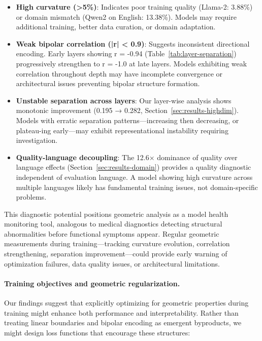 \documentclass[11pt]{article}
\begin{document}
\begin{itemize}
\item \textbf{High curvature (>5\%)}: Indicates poor training quality (Llama-2: 3.88\%) or domain mismatch (Qwen2 on English: 13.38\%). Models may require additional training, better data curation, or domain adaptation.

\item \textbf{Weak bipolar correlation (|r| < 0.9)}: Suggests inconsistent directional encoding. Early layers showing r = -0.94 (Table~\ref{tab:layer-separation}) progressively strengthen to r = -1.0 at late layers. Models exhibiting weak correlation throughout depth may have incomplete convergence or architectural issues preventing bipolar structure formation.

\item \textbf{Unstable separation across layers}: Our layer-wise analysis shows monotonic improvement (0.195 → 0.282, Section~\ref{sec:results-highdim}). Models with erratic separation patterns—increasing then decreasing, or plateau-ing early—may exhibit representational instability requiring investigation.

\item \textbf{Quality-language decoupling}: The 12.6× dominance of quality over language effects (Section~\ref{sec:results-domain}) provides a quality diagnostic independent of evaluation language. A model showing high curvature across multiple languages likely has fundamental training issues, not domain-specific problems.
\end{itemize}

This diagnostic potential positions geometric analysis as a model health monitoring tool, analogous to medical diagnostics detecting structural abnormalities before functional symptoms appear. Regular geometric measurements during training—tracking curvature evolution, correlation strengthening, separation improvement—could provide early warning of optimization failures, data quality issues, or architectural limitations.

\paragraph{Training objectives and geometric regularization.}
Our findings suggest that explicitly optimizing for geometric properties during training might enhance both performance and interpretability. Rather than treating linear boundaries and bipolar encoding as emergent byproducts, we might design loss functions that encourage these structures:
\end{document}

